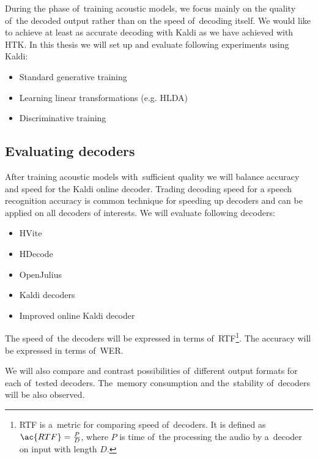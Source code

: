 During the phase of~training acoustic models, we focus mainly on the quality of~the decoded output rather than on the speed of~decoding itself. 
We would like to achieve at least as accurate decoding with Kaldi as we have achieved with \ac{HTK}. In this thesis we will set up and evaluate following experiments using Kaldi:
\begin{itemize}
    \item Standard generative training
    \item Learning linear transformations (e.g. \ac{HLDA})
    \item Discriminative training 
\end{itemize}
 

\subsection{Evaluating decoders} 
\label{sub:compare_rt}
After training acoustic models with~sufficient quality we will balance accuracy and speed for the Kaldi online decoder. Trading decoding speed for a speech recognition accuracy is common technique for speeding up decoders and can be applied on all decoders of interests. We will evaluate following decoders:
\begin{itemize}
    \item HVite  %
    \item HDecode %
    \item OpenJulius %
    \item Kaldi decoders
    \item Improved online Kaldi decoder
\end{itemize}

The speed of~the decoders will be expressed in terms of~\ac{RTF}\footnote{\ac{RTF} is a~metric for comparing speed of~decoders. It is defined as $\ac{RTF} = \frac{P}{D}$, where $P$ is time of~the processing the audio by a~decoder on input with length $D$.}. The accuracy will be expressed in terms of~\ac{WER}.

We will also compare and contrast possibilities of~different output formats for each of~tested decoders. The~memory consumption and the~stability of~decoders will be also observed. 

